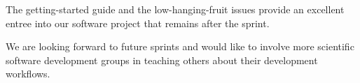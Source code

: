 \documentclass[12pt]{article}
\begin{document}
The getting-started guide and the low-hanging-fruit issues provide an
excellent entree into our software project that remains after the sprint.







We are looking forward to future sprints and would like to involve more
scientific software development groups in teaching others about their
development workflows.

\end{document}
